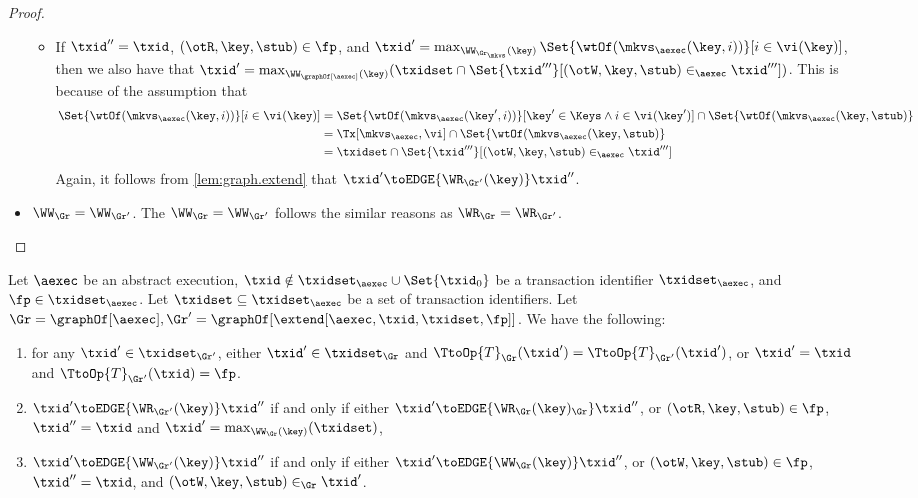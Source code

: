 \begin{proof}
\begin{itemize}
\begin{itemize}
\item If $\txid'' = \txid$, $(\otR, \key, \stub) \in \fp$, and $\txid' = \max_{\WW_{\Gr_\mkvs}(\key)} \Set{\wtOf(\mkvs_{\aexec}(\key, i))}[i \in \vi(\key)]$, 
    then we also have that $\txid' = \max_{\WW_{\graphOf[\aexec]}(\key)} (\txidset \cap \Set{\txid'''}[(\otW, \key, \stub) \in_{\aexec} \txid''']) $. 
This is because of the assumption that 
\begin{align*}
    \Set{\wtOf(\mkvs_{\aexec}(\key, i))}[i \in \vi(\key)]
    & = \Set{\wtOf(\mkvs_{\aexec}(\key', i))}[\key' \in \Keys \land i \in \vi(\key')] \cap \Set{\wtOf(\mkvs_{\aexec}(\key, \stub)} \\
    & = \Tx[\mkvs_{\aexec}, \vi] \cap \Set{\wtOf(\mkvs_{\aexec}(\key, \stub)}  \\
    & = \txidset \cap \Set{\txid'''}[(\otW, \key, \stub) \in_{\aexec} \txid''']
\end{align*}
Again, it follows from \cref{lem:graph.extend} that $\txid' \toEDGE{\WR_{\Gr'}(\key)} \txid''$. 
\end{itemize}
\item \( \WW_{\Gr} = \WW_{\Gr'}\). The \( \WW_{\Gr} = \WW_{\Gr'} \) follows the similar reasons as $\WR_{\Gr} = \WR_{\Gr'}$.
\end{itemize}
\end{proof}

\begin{lemma}
\label{lem:graph.extend}
Let $\aexec$ be an abstract execution, 
$\txid \notin \txidset_{\aexec} \cup \Set{\txid_0}$ be a transaction identifier $\txidset_{\aexec}$, and $\fp \in \txidset_{\aexec}$. 
Let $\txidset \subseteq \txidset_{\aexec}$ be a set of transaction identifiers.
Let $\Gr = \graphOf[\aexec], \Gr' = \graphOf[\extend[\aexec, \txid, \txidset, \fp]]$. 
We have the following: 
\begin{enumerate}
\item for any $\txid' \in \txidset_{\Gr'}$, either $\txid' \in \txidset_{\Gr}$ and $\TtoOp{T}_{\Gr}(\txid') = \TtoOp{T}_{\Gr'}(\txid')$, 
or $\txid' = \txid$ and $\TtoOp{T}_{\Gr'}(\txid) = \fp$.
\item $\txid' \toEDGE{\WR_{\Gr'}(\key)} \txid''$ if and only if either 
$\txid' \toEDGE{\WR_{\Gr}(\key)_{\Gr}} \txid''$, or $(\otR, \key, \stub) \in \fp$, $\txid'' = \txid$ and 
$\txid' = \max_{\WW_{\Gr}(\key)}(\txidset)$, 
\item $\txid' \toEDGE{\WW_{\Gr'}(\key)} \txid''$ if and only if 
either $\txid' \toEDGE{\WW_{\Gr}(\key)} \txid''$, or $(\otW, \key, \stub) \in \fp$, $\txid'' = \txid$, 
and $(\otW, \key, \stub) \in_{\Gr} \txid'$.
\end{enumerate}
\end{lemma}

